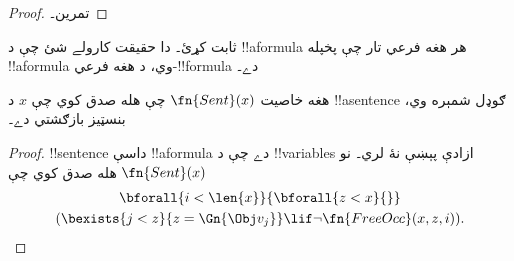 \documentclass[../../../include/open-logic-section]{subfiles}
\begin{document}
\begin{proof}
تمرین۔
\end{proof}

\begin{prob}
 ثابت کړئ۔ دا حقيقت
کارولے شئ چې د !!a{formula} هر هغه فرعي تار چې پخپله !!a{formula}
وي، د هغه فرعي-!!{formula} دے۔
\end{prob}

\begin{prop}
هغه خاصيت $\fn{Sent}(x)$ چې هله صدق کوي چې $x$ د !!a{sentence}
ګوډل شمېره وي، بنسټيز بازګشتي دے۔
\end{prop}

\begin{proof}
!!{sentence} داسې !!a{formula} دے چې د !!{variable}s ازادې پېښې
نۀ لري۔ نو $\fn{Sent}(x)$ هله صدق کوي چې
\begin{multline*}
\bforall{i<\len{x}}{\bforall{z<x}{}}\\
(\bexists{j<z}{z=\Gn{\Obj v_j}} \lif \lnot\fn{FreeOcc}(x,z,i)).
\end{multline*}
\end{proof}
\end{document}
